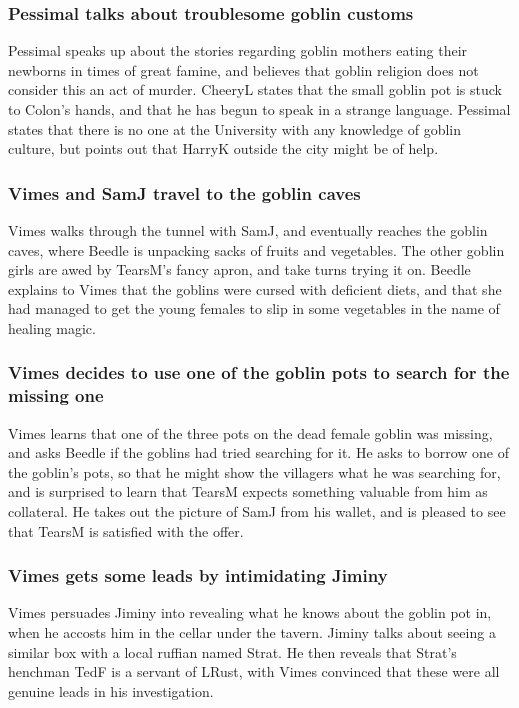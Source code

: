 \subsubsection{\Gls{Pessimal} talks about troublesome goblin customs}
\Gls{Pessimal} speaks up about the stories regarding goblin mothers eating their newborns in times
of great famine, and believes that goblin religion does not consider this an act of murder.
\Gls{CheeryL} states that the small goblin pot is stuck to \Gls{Colon}'s hands, and that he has
begun to speak in a strange language. \Gls{Pessimal} states that there is no one at the University
with any knowledge of goblin culture, but points out that \Gls{HarryK} outside the city might be
of help.

\subsubsection{\Gls{Vimes} and \Gls{SamJ} travel to the goblin caves}
\Gls{Vimes} walks through the tunnel with \Gls{SamJ}, and eventually reaches the goblin caves,
where \Gls{Beedle} is unpacking sacks of fruits and vegetables. The other goblin girls are awed
by \Gls{TearsM}'s fancy apron, and take turns trying it on. \Gls{Beedle} explains to \Gls{Vimes}
that the goblins were cursed with deficient diets, and that she had managed to get the young females
to slip in some vegetables in the name of healing magic.

\subsubsection{\Gls{Vimes} decides to use one of the goblin pots to search for the missing one}
\Gls{Vimes} learns that one of the three pots on the dead female goblin was missing, and asks
\Gls{Beedle} if the goblins had tried searching for it. He asks to borrow one of the goblin's pots,
so that he might show the villagers what he was searching for, and is surprised to learn that
\Gls{TearsM} expects something valuable from him as collateral. He takes out the picture of
\Gls{SamJ} from his wallet, and is pleased to see that \Gls{TearsM} is satisfied with the offer.

\subsubsection{\Gls{Vimes} gets some leads by intimidating \Gls{Jiminy}}
\Gls{Vimes} persuades \Gls{Jiminy} into revealing what he knows about the goblin pot in, when he
accosts him in the cellar under the tavern. \Gls{Jiminy} talks about seeing a similar box with
a local ruffian named \Gls{Strat}. He then reveals that \Gls{Strat}'s henchman \Gls{TedF} is a
servant of \Gls{LRust}, with \Gls{Vimes} convinced that these were all genuine leads in his
investigation.

